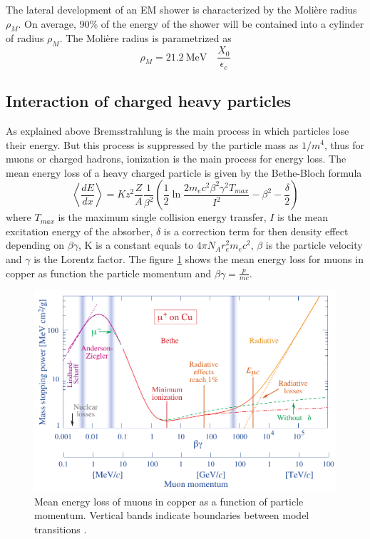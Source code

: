 The lateral development of an EM shower is characterized by the Moli\`ere radius $\rho_{M}$. On average, 90\% of the energy of the shower will be contained into a cylinder of radius $\rho_{M}$. The Moli\`ere radius is parametrized as \cite{Wigmans:392793}
\begin{equation}
  \rho_{M} = \SI{21.2}{\mega\eV} \quad \frac{X_0}{\epsilon_c}
\end{equation}

\subsection{Interaction of charged heavy particles}

As explained above Bremsstrahlung is the main process in which particles lose their energy. But this process is suppressed by the particle mass as $1/m^4$, thus for muons or charged hadrons, ionization is the main process for energy loss. The mean energy loss of a heavy charged particle is given by the Bethe-Bloch formula \cite{Wigmans:392793}
\begin{equation}
  \left<\frac{dE}{dx}\right> = Kz^2\frac{Z}{A}\frac{1}{\beta^2}\left(\frac{1}{2}\ln\frac{2m_ec^2\beta^2\gamma^2T_{max}}{I^2} - \beta^2 - \frac{\delta}{2}\right)
\end{equation}
where $T_{max}$ is the maximum single collision energy transfer, $I$ is the mean excitation energy of the absorber, $\delta$ is a correction term for then density effect depending on $\beta\gamma$, K is a constant equals to $4\pi{}N_Ar_e^2m_ec^2$, $\beta$ is the particle velocity and $\gamma$ is the Lorentz factor. The figure \ref{fig:BetheBloch} shows the mean energy loss for muons in copper as function the particle momentum and $\beta\gamma = \frac{p}{mc}$.

\begin{figure}[htbp!]
  \centering
  \includegraphics[width=0.7\linewidth]{chap2/fig/rpp_icru49_cu_col.pdf}
  \caption{Mean energy loss of muons in copper as a function of particle momentum. Vertical bands indicate boundaries between model transitions \cite{Patrignani:2016xqp}.} \label{fig:BetheBloch}
\end{figure}

